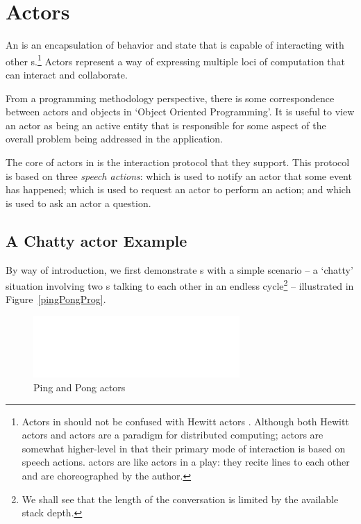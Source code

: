 \chapter{Actors}
\label{actors}

An  is an encapsulation of behavior and state that is capable of interacting with other s.\footnote{Actors in \Sr should not be confused with Hewitt actors \cite{agha-hew:87}. Although both Hewitt actors and \Sr actors are a paradigm for distributed computing; \Sr actors are somewhat higher-level in that their primary mode of interaction is based on speech actions. \Sr actors are like actors in a play: they recite lines to each other and are choreographed by the author.} Actors represent a way of expressing multiple loci of computation that can interact and collaborate.

\begin{aside}
From a programming methodology perspective, there is some correspondence between actors and objects in `Object Oriented Programming'.  It is useful to view an actor as being an active entity that is responsible for some aspect of the overall problem being addressed in the application.
\end{aside}

The core of actors in \Sr is the interaction protocol that they support. This protocol is based on three \emph{speech actions}:  which is used to notify an actor that some event has happened;  which is used to request an actor to perform an action; and  which is used to ask an actor a question.

\section{A Chatty actor Example}
\label{talkers}
By way of introduction, we first demonstrate s with a simple scenario -- a `chatty' situation involving two s talking to each other in an endless cycle\footnote{We shall see that the length of the conversation is limited by the available stack depth.} -- illustrated in Figure~\vref{pingPongProg}. 
\begin{figure}[htbp]
\begin{center}
\includegraphics[width=0.7\textwidth]{diagrams/PingAndPong}
\caption{Ping and Pong actors}
\label{pingPongProg}
\end{center}
\end{figure}

